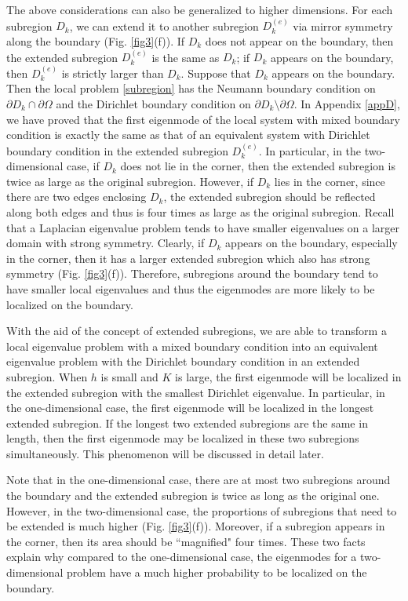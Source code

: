 \documentclass[a4paper,11pt]{article}
\begin{document}
The above considerations can also be generalized to higher dimensions. For each subregion $D_k$, we can extend it to another subregion $D_k^{(e)}$ via mirror symmetry along the boundary (Fig. \ref{fig3}(f)). If $D_k$ does not appear on the boundary, then the extended subregion $D_k^{(e)}$ is the same as $D_k$; if $D_k$ appears on the boundary, then $D_k^{(e)}$ is strictly larger than $D_k$. Suppose that $D_k$ appears on the boundary. Then the local problem \eqref{subregion} has the Neumann boundary condition on $\partial D_k \cap \partial \Omega$ and the Dirichlet boundary condition on $\partial D_k \setminus \partial \Omega$. In Appendix \ref{appD}, we have proved that the first eigenmode of the local system with mixed boundary condition is exactly the same as that of an equivalent system with Dirichlet boundary condition in the extended subregion $D_k^{(e)}$. In particular, in the two-dimensional case, if $D_k$ does not lie in the corner, then the extended subregion is twice as large as the original subregion. However, if $D_k$ lies in the corner, since there are two edges enclosing $D_k$, the extended subregion should be reflected along both edges and thus is four times as large as the original subregion. Recall that a Laplacian eigenvalue problem tends to have smaller eigenvalues on a larger domain with strong symmetry. Clearly, if $D_k$ appears on the boundary, especially in the corner, then it has a larger extended subregion which also has strong symmetry (Fig. \ref{fig3}(f)). Therefore, subregions around the boundary tend to have smaller local eigenvalues and thus the eigenmodes are more likely to be localized on the boundary.

With the aid of the concept of extended subregions, we are able to transform a local eigenvalue problem with a mixed boundary condition into an equivalent eigenvalue problem with the Dirichlet boundary condition in an extended subregion. When $h$ is small and $K$ is large, the first eigenmode will be localized in the extended subregion with the smallest Dirichlet eigenvalue. In particular, in the one-dimensional case, the first eigenmode will be localized in the longest extended subregion. If the longest two extended subregions are the same in length, then the first eigenmode may be localized in these two subregions simultaneously. This phenomenon will be discussed in detail later.

Note that in the one-dimensional case, there are at most two subregions around the boundary and the extended subregion is twice as long as the original one. However, in the two-dimensional case, the proportions of subregions that need to be extended is much higher (Fig. \ref{fig3}(f)). Moreover, if a subregion appears in the corner, then its area should be ``magnified" four times. These two facts explain why compared to the one-dimensional case, the eigenmodes for a two-dimensional problem have a much higher probability to be localized on the boundary.
\end{document}
